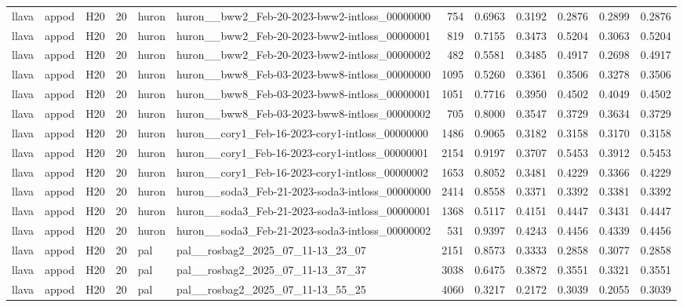 \begin{table}[tbp]
\begin{tabular}{lllrllrrrrrr}
llava & appod & H20 & 20 & huron & huron\_\_bww2\_Feb-20-2023-bww2-intloss\_00000000 & 754 & 0.6963 & 0.3192 & 0.2876 & 0.2899 & 0.2876 \\
llava & appod & H20 & 20 & huron & huron\_\_bww2\_Feb-20-2023-bww2-intloss\_00000001 & 819 & 0.7155 & 0.3473 & 0.5204 & 0.3063 & 0.5204 \\
llava & appod & H20 & 20 & huron & huron\_\_bww2\_Feb-20-2023-bww2-intloss\_00000002 & 482 & 0.5581 & 0.3485 & 0.4917 & 0.2698 & 0.4917 \\
llava & appod & H20 & 20 & huron & huron\_\_bww8\_Feb-03-2023-bww8-intloss\_00000000 & 1095 & 0.5260 & 0.3361 & 0.3506 & 0.3278 & 0.3506 \\
llava & appod & H20 & 20 & huron & huron\_\_bww8\_Feb-03-2023-bww8-intloss\_00000001 & 1051 & 0.7716 & 0.3950 & 0.4502 & 0.4049 & 0.4502 \\
llava & appod & H20 & 20 & huron & huron\_\_bww8\_Feb-03-2023-bww8-intloss\_00000002 & 705 & 0.8000 & 0.3547 & 0.3729 & 0.3634 & 0.3729 \\
llava & appod & H20 & 20 & huron & huron\_\_cory1\_Feb-16-2023-cory1-intloss\_00000000 & 1486 & 0.9065 & 0.3182 & 0.3158 & 0.3170 & 0.3158 \\
llava & appod & H20 & 20 & huron & huron\_\_cory1\_Feb-16-2023-cory1-intloss\_00000001 & 2154 & 0.9197 & 0.3707 & 0.5453 & 0.3912 & 0.5453 \\
llava & appod & H20 & 20 & huron & huron\_\_cory1\_Feb-16-2023-cory1-intloss\_00000002 & 1653 & 0.8052 & 0.3481 & 0.4229 & 0.3366 & 0.4229 \\
llava & appod & H20 & 20 & huron & huron\_\_soda3\_Feb-21-2023-soda3-intloss\_00000000 & 2414 & 0.8558 & 0.3371 & 0.3392 & 0.3381 & 0.3392 \\
llava & appod & H20 & 20 & huron & huron\_\_soda3\_Feb-21-2023-soda3-intloss\_00000001 & 1368 & 0.5117 & 0.4151 & 0.4447 & 0.3431 & 0.4447 \\
llava & appod & H20 & 20 & huron & huron\_\_soda3\_Feb-21-2023-soda3-intloss\_00000002 & 531 & 0.9397 & 0.4243 & 0.4456 & 0.4339 & 0.4456 \\
llava & appod & H20 & 20 & pal & pal\_\_rosbag2\_2025\_07\_11-13\_23\_07 & 2151 & 0.8573 & 0.3333 & 0.2858 & 0.3077 & 0.2858 \\
llava & appod & H20 & 20 & pal & pal\_\_rosbag2\_2025\_07\_11-13\_37\_37 & 3038 & 0.6475 & 0.3872 & 0.3551 & 0.3321 & 0.3551 \\
llava & appod & H20 & 20 & pal & pal\_\_rosbag2\_2025\_07\_11-13\_55\_25 & 4060 & 0.3217 & 0.2172 & 0.3039 & 0.2055 & 0.3039 \\

\end{tabular}
\end{table}
